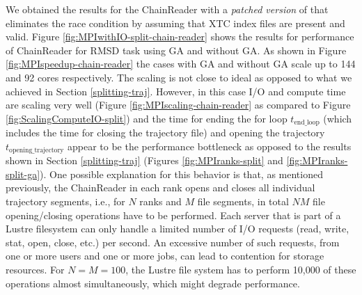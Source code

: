 We obtained the results for the ChainReader with a \emph{patched version} of  that eliminates the race condition by assuming that XTC index files are present and valid. 
Figure \ref{fig:MPIwithIO-split-chain-reader} shows the results for performance of ChainReader for RMSD task using GA and without GA. 
As shown in Figure \ref{fig:MPIspeedup-chain-reader} the cases with GA and without GA scale up to 144 and 92 cores respectively.
The scaling is not close to ideal as opposed to what we achieved in Section \ref{splitting-traj}. 
However, in this case I/O and compute time are scaling very well (Figure \ref{fig:MPIscaling-chain-reader} as compared to Figure \ref{fig:ScalingComputeIO-split}) and the time for ending the for loop \texttt{$t_{\text{end\_loop}}$} (which includes the time for closing the trajectory file) and opening the trajectory \texttt{$t_{\text{opening\_trajectory}}$} appear to be the performance bottleneck as opposed to the results shown in Section \ref{splitting-traj} (Figures \ref{fig:MPIranks-split} and \ref{fig:MPIranks-split-ga}). 
One possible explanation for this behavior is that, as mentioned previously, the ChainReader in each rank opens and closes all individual trajectory segments, i.e., for $N$ ranks and $M$ file segments, in total $N M$ file opening/closing operations have to be performed. 
Each server that is part of a Lustre filesystem can only handle a limited number of I/O requests (read, write, stat, open, close, etc.) per second.
An excessive number of such requests, from one or more users and one or more jobs, can lead to contention for storage resources. 
For $N=M=100$, the Lustre file system has to perform 10,000 of these operations almost simultaneously, which might degrade performance. 
 
